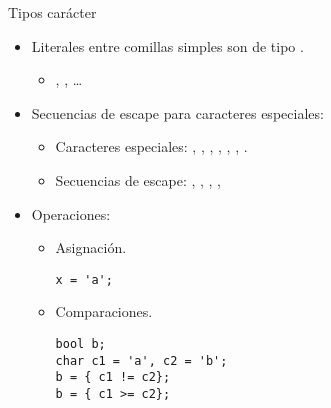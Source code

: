 \begin{frame}[t,fragile]{Tipos carácter}
\begin{itemize}
  \item Literales entre comillas simples son de tipo .
    \begin{itemize}
      \item {}, , \ldots
    \end{itemize}
  \item Secuencias de escape para caracteres especiales:
    \begin{itemize}
      \item Caracteres especiales: , , 
        , ,
        , , 
        .
      \item Secuencias de escape:
        \cppkey{\textbackslash{}\textbackslash}, 
        , 
        , 
        , 
    \end{itemize}
  \item Operaciones:
    \begin{itemize}
      \item Asignación.
\begin{lstlisting}
x = 'a';
\end{lstlisting}
      \item Comparaciones.
\begin{lstlisting}
bool b;
char c1 = 'a', c2 = 'b';
b = { c1 != c2};
b = { c1 >= c2};
\end{lstlisting}
    \end{itemize}
\end{itemize}
\end{frame}

